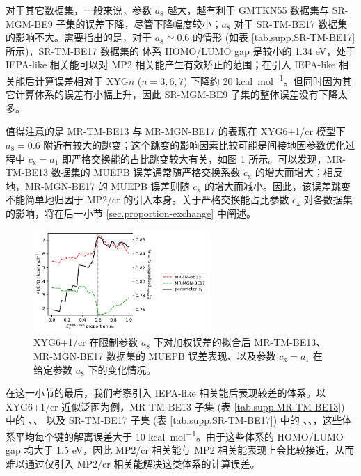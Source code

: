 对于其它数据集，一般来说，参数 $a_8$ 越大，越有利于 GMTKN55 数据集与 SR-MGM-BE9 子集的误差下降，尽管下降幅度较小；$a_8$ 对于 SR-TM-BE17 数据集的影响不大。需要指出的是，对于 $a_8 \simeq 0.6$ 的情形 (如表 \ref{tab.supp.SR-TM-BE17} 所示)，SR-TM-BE17 数据集的  体系 HOMO/LUMO gap 是较小的 1.34 eV，处于 IEPA-like 相关能可以对 MP2 相关能产生有效矫正的范围；在引入 IEPA-like 相关能后计算误差相对于 XYG$n$ ($n=3,6,7$) 下降约 20 \si{kcal.mol^{-1}}。但同时因为其它计算体系的误差有小幅上升，因此 SR-MGM-BE9 子集的整体误差没有下降太多。

值得注意的是 MR-TM-BE13 与 MR-MGN-BE17 的表现在 XYG6+1/cr 模型下 $a_8 = 0.6$ 附近有较大的跳变；这个跳变的影响因素比较可能是间接地因参数优化过程中 $c_\mathrm{x} = a_1$ 即严格交换能的占比跳变较大有关，如图 \ref{fig.plot-seq-cr-against-cx} 所示。可以发现，MR-TM-BE13 数据集的 MUEPB 误差通常随严格交换系数 $c_\mathrm{x}$ 的增大而增大；相反地，MR-MGN-BE17 的 MUEPB 误差则随 $c_\mathrm{x}$ 的增大而减小。因此，该误差跳变不能简单地归因于 MP2/cr 的引入本身。关于严格交换能占比参数 $c_\mathrm{x}$ 对各数据集的影响，将在后一小节 \ref{sec.proportion-exchange} 中阐述。

\begin{figure}[h]
  \centering
  \caption{XYG6+1/cr 在限制参数 $a_8$ 下对加权误差的拟合后 MR-TM-BE13、MR-MGN-BE17 数据集的 MUEPB 误差表现、以及参数 $c_\mathrm{x} = a_1$ 在给定参数 $a_8$ 下的变化情况。}
  \label{fig.plot-seq-cr-against-cx}
  \includegraphics[width=0.6\textwidth]{assets/plot-seq-cr-against-cx.pdf}
\end{figure}

在这一小节的最后，我们考察引入 IEPA-like 相关能后表现较差的体系。以 XYG6+1/cr 近似泛函为例，MR-TM-BE13 子集 (表 \ref{tab.supp.MR-TM-BE13}) 中的 、、 以及 SR-TM-BE17 子集 (表 \ref{tab.supp.SR-TM-BE17}) 中的 、、，这些体系平均每个键的解离误差大于 10 \si{kcal.mol^{-1}}。由于这些体系的 HOMO/LUMO gap 均大于 1.5 eV，因此 MP2/cr 相关能与 MP2 相关能表现上会比较接近，从而难以通过仅引入 MP2/cr 相关能解决这类体系的计算误差。

